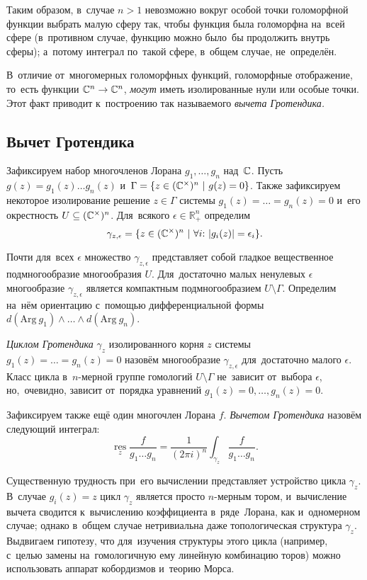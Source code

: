 \documentclass[a4paper,oneside]{article}
\begin{document}
Таким образом, в~случае $n > 1$ невозможно вокруг особой точки голоморфной функции
выбрать малую сферу так, чтобы функция была голоморфна на~всей сфере (в~противном случае,
функцию можно было~бы продолжить внутрь сферы); а~потому интеграл по~такой сфере, в~общем случае, не~определён.

В~отличие от~многомерных голоморфных функций, голоморфные отображение, то~есть функции $\mathbb{C}^n \rightarrow \mathbb{C}^n$,
\textit{могут} иметь изолированные нули или особые точки. Этот факт приводит к~построению так называемого \textit{вычета Гротендика.}

\subsection{Вычет Гротендика}
Зафиксируем набор многочленов Лорана $g_1, \ldots, g_n$ над~$\mathbb{C}$.
Пусть $g(z) = g_1(z) \ldots g_n(z)$ и~$\Gamma = \{ z \in (\complex^\times)^n \ | \ g(z) = 0 \}$.
Также зафиксируем некоторое изолирование решение $z \in \Gamma$ системы $g_1(z) = \ldots = g_n(z) = 0$ и~его окрестность $U \subseteq (\mathbb{C}^\times)^n$.
Для~всякого $\epsilon \in \mathbb{R}_{+}^n$ определим
\[
  \gamma_{z, \epsilon} = \{ z \in (\mathbb{C}^\times)^n\ | \ \forall i{:}\ |g_i(z)| = \epsilon_i \}.
\]

Почти для~всех $\epsilon$ множество $\gamma_{z, \epsilon}$ представляет собой гладкое вещественное подмногообразие многообразия $U$.
Для~достаточно малых ненулевых $\epsilon$ многообразие $\gamma_{z, \epsilon}$ является компактным подмногообразием $U \setminus \Gamma$.
Определим на~нём ориентацию с~помощью дифференциальной формы $d(\mathrm{Arg}\ g_1) \wedge \ldots \wedge d(\mathrm{Arg}\ g_n)$.

\textit{Циклом Гротендика} $\gamma_z$ \cite{GelKho02} изолированного корня $z$ системы $g_1(z) = \ldots = g_n(z) = 0$ назовём многообразие $\gamma_{z, \epsilon}$ для~достаточно малого $\epsilon$.
Класс цикла в~$n$-мерной группе гомологий $U \setminus \Gamma$ не~зависит от~выбора $\epsilon$, но,~очевидно, зависит от~порядка уравнений $g_1(z) = 0, \ldots, g_n(z) = 0$.

Зафиксируем также ещё один многочлен Лорана $f$. \textit{Вычетом Гротендика} назовём следующий интеграл:
\[
  \operatorname*{res}\limits_{z} \frac{f}{g_1 \ldots g_n} = \frac{1}{(2 \pi i)^n} \int_{\gamma_z} \frac{f}{g_1 \ldots g_n}.
\]

Существенную трудность при~его вычислении представляет устройство цикла $\gamma_z$.
В~случае $g_i(z) = z$ цикл $\gamma_z$ является просто $n$-мерным тором, и~вычисление вычета
сводится к~вычислению коэффициента в~ряде~Лорана, как и~одномерном случае; однако в~общем случае
нетривиальна даже топологическая структура $\gamma_z$. Выдвигаем гипотезу, что для~изучения
структуры этого цикла (например, с~целью замены на~гомологичную ему линейную комбинацию торов)
можно использовать аппарат кобордизмов и~теорию Морса.
\end{document}

